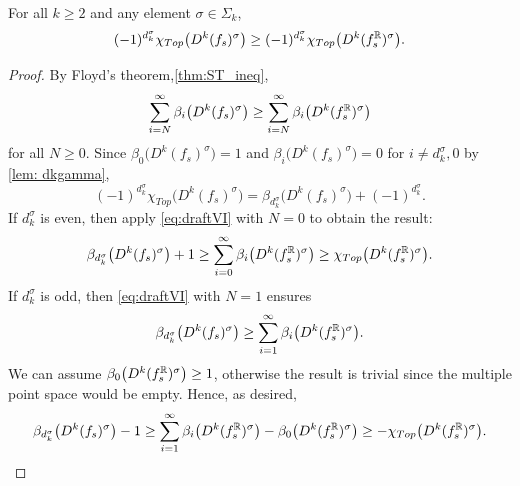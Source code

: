 \documentclass[a4paper,12pt]{amsart}
\begin{document}
\begin{proposition}\label{prop:draftVII}
For all $k\geq2$ and any element $\sigma\in\Sigma_k$,
\[ (-1)^{d_k^\sigma}\chi_{Top}\big(D^k(f_s)^\sigma\big)\geq(-1)^{d_k^\sigma}\chi_{Top}\big(D^k(f_s^{\mathbb{R}})^\sigma\big).\]
\end{proposition}
\begin{proof}
By Floyd's theorem,\cref{thm:ST_ineq},
\begin{equation}
\sum_{i=N}^\infty \beta_i\big(D^k(f_s)^\sigma\big)\geq\sum_{i=N}^\infty \beta_i\big(D^k(f_s^{\mathbb{R}})^\sigma\big)
\label{eq:draftVI}
\end{equation}
for all $N\geq 0$. 
Since $\beta_{0}\big(D^k(f_s)^\sigma\big) = 1$ and $\beta_{i}\big(D^k(f_s)^\sigma\big) = 0$ for $i\neq d_k^\sigma,0$  
by \cref{lem: dkgamma}, 
$$(-1)^{d_k^\sigma}\chi_{Top}\big(D^k(f_s)^\sigma\big) = \beta_{d_k^\sigma}\big(D^k(f_s)^\sigma\big) + (-1)^{d_k^\sigma}.$$
If $d_k^\sigma$ is even, then apply \cref{eq:draftVI} with $N=0$ to obtain the result:
$$ \beta_{d_k^\sigma}\big(D^k(f_s)^\sigma\big) + 1 \geq \sum_{i=0}^\infty \beta_i\big(D^k(f_s^{\mathbb{R}})^\sigma\big) \geq \chi_{Top}\big(D^k(f_s^{\mathbb{R}})^\sigma\big).$$
If $d_k^\sigma$ is odd, then \cref{eq:draftVI} with $N=1$ ensures
$$ \beta_{d_k^\sigma}\big(D^k(f_s)^\sigma\big)  \geq \sum_{i=1}^\infty \beta_i\big(D^k(f_s^{\mathbb{R}})^\sigma\big).$$
We can assume $\beta_0\big(D^k(f_s^{\mathbb{R}})^\sigma\big) \geq 1$, otherwise the result is trivial since the multiple point space would be empty. Hence, as desired,
\[ \beta_{d_k^\sigma}\big(D^k(f_s)^\sigma\big) - 1 \geq \sum_{i=1}^\infty \beta_i\big(D^k(f_s^{\mathbb{R}})^\sigma\big) - \beta_0\big(D^k(f_s^{\mathbb{R}})^\sigma\big)  \geq -\chi_{Top}\big(D^k(f_s^{\mathbb{R}})^\sigma\big).\qedhere\]
\end{proof}
\end{document}
